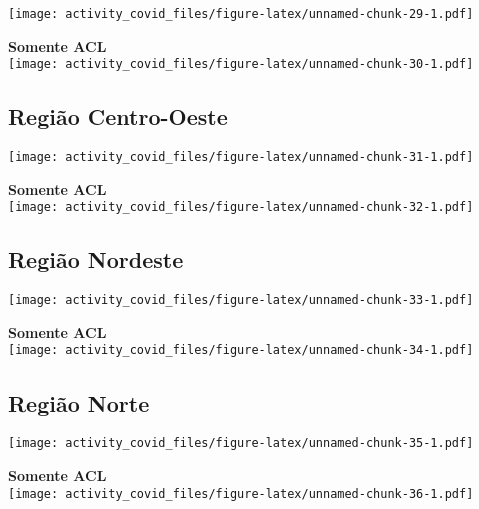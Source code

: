 \documentclass[
]{article}
\begin{document}
\texttt{[image: activity\_covid\_files/figure-latex/unnamed-chunk-29-1.pdf]}

\pagebreak

\textbf{Somente ACL}\\
\texttt{[image: activity\_covid\_files/figure-latex/unnamed-chunk-30-1.pdf]}

\pagebreak

\hypertarget{regiuxe3o-centro-oeste-3}{%
\subsection{Região Centro-Oeste}\label{regiuxe3o-centro-oeste-3}}

\texttt{[image: activity\_covid\_files/figure-latex/unnamed-chunk-31-1.pdf]}

\pagebreak

\textbf{Somente ACL}\\
\texttt{[image: activity\_covid\_files/figure-latex/unnamed-chunk-32-1.pdf]}

\pagebreak

\hypertarget{regiuxe3o-nordeste-3}{%
\subsection{Região Nordeste}\label{regiuxe3o-nordeste-3}}

\texttt{[image: activity\_covid\_files/figure-latex/unnamed-chunk-33-1.pdf]}

\pagebreak

\textbf{Somente ACL}\\
\texttt{[image: activity\_covid\_files/figure-latex/unnamed-chunk-34-1.pdf]}

\pagebreak

\hypertarget{regiuxe3o-norte-3}{%
\subsection{Região Norte}\label{regiuxe3o-norte-3}}

\texttt{[image: activity\_covid\_files/figure-latex/unnamed-chunk-35-1.pdf]}

\pagebreak

\textbf{Somente ACL}\\
\texttt{[image: activity\_covid\_files/figure-latex/unnamed-chunk-36-1.pdf]}
\end{document}
